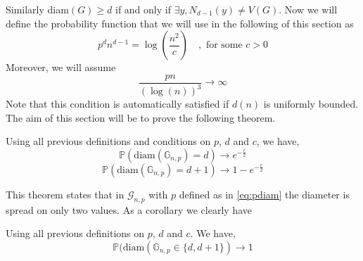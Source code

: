 \newline
Similarly diam$(G) \geq d $ if and only if $\exists y, N_{d-1}(y) \neq V(G)$.
\newline
Now we will define the probability function that we will use in the following of this section as 
\begin{equation} \label{eq:pdiam}
	p^d n^{d-1} = \log(\frac{n^2}{c}) \quad, \text{  for some } c >0
\end{equation}
Moreover, we will assume
\begin{equation}\label{eq:logtrois}
	\frac{pn}{(\log(n))^3} \longrightarrow \infty
\end{equation}
Note that this condition is automatically satisfied if $d(n)$ is uniformly bounded.
The aim of this section will be to prove the following theorem.
\begin{theorem}\label{th:diam2}
	Using all previous definitions and conditions on $p$, $d$ and $c$, we have,
	\begin{equation}
		\mathbb{P}(\text{diam}(\mathbb{G}_{n, p}) = d) \longrightarrow e^{-\frac{c}{2}}
	\end{equation}	
	\begin{equation}
		\mathbb{P}(\text{diam}(\mathbb{G}_{n,p}) = d + 1) \longrightarrow 1 - e^{-\frac{c}{2}}
	\end{equation}
\end{theorem}
This theorem states that in $\mathcal{G}_{n,p}$ with $p$ defined as in \eqref{eq:pdiam} the diameter is spread on only two values.
As a corollary we clearly have
\begin{corollary}
	Using all previous definitions on $p$, $d$ and $c$. We have,
	\begin{equation}
		\mathbb{P}(\text{diam}(\mathbb{G}_{n,p} \in \{d, d+1\}) \longrightarrow 1
	\end{equation}
\end{corollary}

